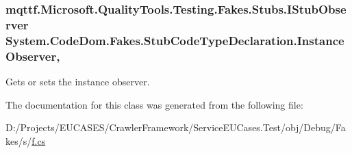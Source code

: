 \hypertarget{class_system_1_1_code_dom_1_1_fakes_1_1_stub_code_type_declaration_a8a68c4b53e532274525d3a13b1d6da47}{
\subsubsection[{Instance\-Observer}]{\setlength{\rightskip}{0pt plus 5cm}mqttf.\-Microsoft.\-Quality\-Tools.\-Testing.\-Fakes.\-Stubs.\-I\-Stub\-Observer System.\-Code\-Dom.\-Fakes.\-Stub\-Code\-Type\-Declaration.\-Instance\-Observer\hspace{0.3cm}{\ttfamily [get]}, {\ttfamily [set]}}}\label{class_system_1_1_code_dom_1_1_fakes_1_1_stub_code_type_declaration_a8a68c4b53e532274525d3a13b1d6da47}


Gets or sets the instance observer.



The documentation for this class was generated from the following file\-:\begin{DoxyCompactItemize}
\item 
D\-:/\-Projects/\-E\-U\-C\-A\-S\-E\-S/\-Crawler\-Framework/\-Service\-E\-U\-Cases.\-Test/obj/\-Debug/\-Fakes/s/\hyperlink{s_2f_8cs}{f.\-cs}\end{DoxyCompactItemize}
